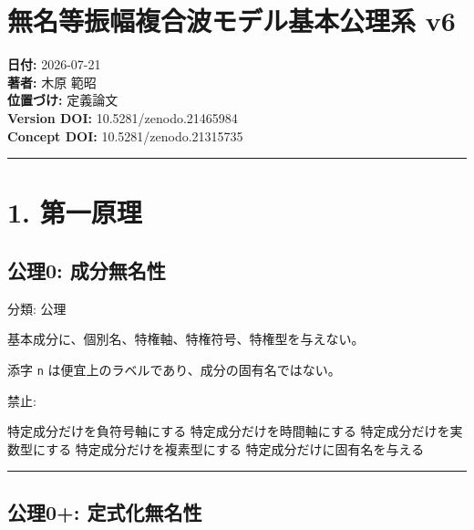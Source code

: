 \documentclass[
  a4paper,
]{ltjsarticle}
\author{}
\date{}
\newenvironment{Shaded}{}{}
\newcommand{\NormalTok}[1]{#1}
\begin{document}
\section{無名等振幅複合波モデル基本公理系
v6}\label{ux7121ux540dux7b49ux632fux5e45ux8907ux5408ux6ce2ux30e2ux30c7ux30ebux57faux672cux516cux7406ux7cfb-v6}

\textbf{日付:} 2026-07-21\\
\textbf{著者:} 木原 範昭\\
\textbf{位置づけ:} 定義論文\\
\textbf{Version DOI:} 10.5281/zenodo.21465984\\
\textbf{Concept DOI:} 10.5281/zenodo.21315735

\begin{center}\rule{0.5\linewidth}{0.5pt}\end{center}

\section{1. 第一原理}\label{ux7b2cux4e00ux539fux7406}

\subsection{公理0:
成分無名性}\label{ux516cux74060-ux6210ux5206ux7121ux540dux6027}

分類: 公理

基本成分に、個別名、特権軸、特権符号、特権型を与えない。

添字 \texttt{n} は便宜上のラベルであり、成分の固有名ではない。

禁止:

\begin{Shaded}
\begin{Highlighting}[]
\NormalTok{特定成分だけを負符号軸にする}
\NormalTok{特定成分だけを時間軸にする}
\NormalTok{特定成分だけを実数型にする}
\NormalTok{特定成分だけを複素型にする}
\NormalTok{特定成分だけに固有名を与える}
\end{Highlighting}
\end{Shaded}

\begin{center}\rule{0.5\linewidth}{0.5pt}\end{center}

\subsection{公理0+:
定式化無名性}\label{ux516cux74060-ux5b9aux5f0fux5316ux7121ux540dux6027}
\end{document}
